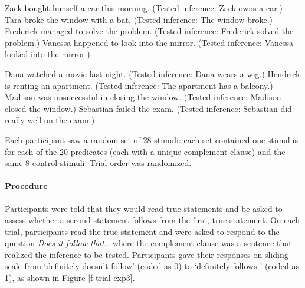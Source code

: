 \documentclass[11pt,fleqn]{article}
\newcommand{\6}{\mbox{$[\hspace*{-.6mm}[$}}
\newcommand{\9}{\mbox{$]\hspace*{-.6mm}]$}}
\begin{document}
		
\begin{exe}
\ex\label{control-good2}
\begin{xlist}
 Zack bought himself a car this morning. (Tested inference: Zack owns a car.)
 Tara broke the window with a bat. (Tested inference: The window broke.)
 Frederick managed to solve the problem. (Tested inference: Frederick solved the problem.)
 Vanessa happened to look into the mirror. (Tested inference: Vanessa looked into the mirror.)
\end{xlist}
\ex\label{control-bad2}
\begin{xlist}
 Dana watched a movie last night. (Tested inference: Dana wears a wig.)
 Hendrick is renting an apartment. (Tested inference: The apartment has a balcony.)
 Madison was unsuccessful in closing the window. (Tested inference:  Madison closed the window.)
 Sebastian failed the exam. (Tested inference: Sebastian did really well on the exam.)
\end{xlist}
\end{exe}

Each participant saw a random set of 28 stimuli: each set contained one stimulus for each of the 20 predicates (each with a unique complement clause) and the same 8 control stimuli. Trial order was randomized.


\paragraph{Procedure} Participants were told that they would read true statements and be asked to assess whether a second statement follows from the first, true statement. On each trial, participants read the true statement and were asked to respond to the question {\em Does it follow that\ldots} where the complement clause was a sentence that realized the inference to be tested.  Participants gave their responses on sliding scale from `definitely doesn't follow' (coded as 0) to `definitely follows ' (coded as 1), as shown in Figure \ref{f-trial-exp3}.
\end{document}
